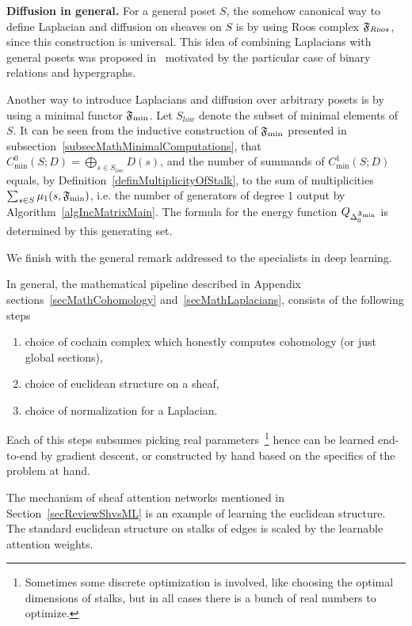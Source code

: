 \textbf{Diffusion in general.} For a general poset $S$, the somehow canonical way to define Laplacian and diffusion on sheaves on $S$ is by using Roos complex $\mathfrak{F}_{Roos}$, since this construction is universal. This idea of combining Laplacians with general posets was proposed in~\cite{HypergraphsSimpSets} motivated by the particular case of binary relations and hypergraphs. 

Another way to introduce Laplacians and diffusion over arbitrary posets is by using a minimal functor $\mathfrak{F}_{\min}$. Let $S_{low}$ denote the subset of minimal elements of $S$. It can be seen from the inductive construction of $\mathfrak{F}_{\min}$ presented in subsection~\ref{subsecMathMinimalComputations}, that $C^0_{\min}(S;D)=\bigoplus_{s\in S_{low}}D(s)$, and the number of summands of $C^1_{\min}(S;D)$ equals, by Definition~\ref{definMultiplicityOfStalk}, to the sum of multiplicities $\sum_{s\in S} \mu_1(s,\mathfrak{F}_{\min})$, i.e. the number of generators of degree $1$ output by Algorithm~\ref{algIncMatrixMain}. The formula for the energy function $Q_{\Delta_0^{\mathfrak{F}_{\min}}}$ is determined by this generating set.

We finish with the general remark addressed to the specialists in deep learning.

\begin{rem}
In general, the mathematical pipeline described in Appendix sections~\ref{secMathCohomology} and~\ref{secMathLaplacians}, consists of the following steps 
\begin{enumerate}
  \item choice of cochain complex which honestly computes cohomology (or just global sections),
  \item choice of euclidean structure on a sheaf,
  \item choice of normalization for a Laplacian.
\end{enumerate}
Each of this steps subsumes picking real parameters~\footnote{Sometimes some discrete optimization is involved, like choosing the optimal dimensions of stalks, but in all cases there is a bunch of real numbers to optimize.} hence can be learned end-to-end by gradient descent, or constructed by hand based on the specifics of the problem at hand. 
\end{rem}

\begin{ex}
The mechanism of sheaf attention networks mentioned in Section~\ref{secReviewShvsML} is an example of learning the euclidean structure. The standard euclidean structure on stalks of edges is scaled by the learnable attention weights. 
\end{ex}

